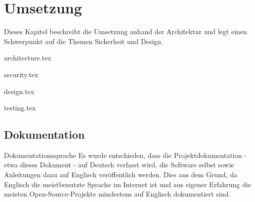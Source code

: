 \begin{comment}
(Implementierung) Architektur und Design beschrieben: Mit begründeten Architekturentscheidungen, mit Diskussion, wie Qualitätsattribute sichergestellt wurden (welche Qualität wurde erreicht?), mit Dokumentation, welche Experimente/Tests durchgeführt wurden und welche Lösungsoptionen aufgrund der Ergebnisse dieser Experimente/Tests
verworfen wurden (was ging schief?)
\end{comment}

\chapter{Umsetzung}
Dieses Kapitel beschreibt die Umsetzung anhand der Architektur und legt einen Schwerpunkt auf die Themen Sicherheit und Design.

{architecture.tex}

\clearpage
{security.tex}

\clearpage
{design.tex}

\clearpage
{testing.tex}

\section{Dokumentation}

\begin{decision}{Dokumentationssprache}
Es wurde entschieden, dass die Projektdokumentation - etwa dieses Dokument - auf Deutsch verfasst wird, die Software selbst sowie Anleitungen dazu auf Englisch veröffentlich werden. Dies aus dem Grund, da Englisch die meistbenutzte Sprache im Internet ist \cite{websitelanguages} und aus eigener Erfahrung die meisten Open-Source-Projekte mindestens auf Englisch dokumentiert sind.
\end{decision}